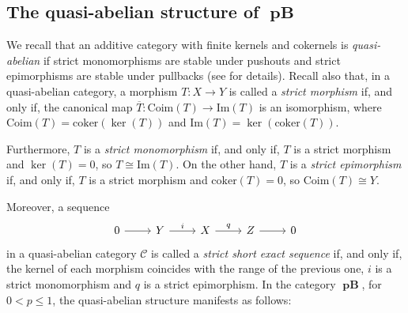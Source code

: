 \documentclass[12pt,a4paper]{amsproc}
\theoremstyle{remark}
\theoremstyle{definition}
\newcommand{\pBan}{\operatorname{\textbf{pB}}}
\numberwithin{equation}{section}
\begin{document}
\subsection{The quasi-abelian structure of \texorpdfstring{$\boldsymbol{\pBan}$}{pBan}} \label{subsec:quasi-abelian} \label{sec:pre_2.2}

We recall that an additive category with finite kernels and cokernels is \emph{quasi-abelian} if strict monomorphisms are stable under pushouts and strict epimorphisms are stable under pullbacks (see \cite{buehler2010, schneiders1999} for details). Recall also that, in a quasi-abelian category, a morphism $T: X \to Y$ is called a \emph{strict morphism} if, and only if, the canonical map $\overline{T}: \mathrm{Coim}(T) \to \mathrm{Im}(T)$ is an isomorphism, where $\mathrm{Coim}(T) = \mathrm{coker}(\ker(T))$ and $\mathrm{Im}(T) = \ker(\mathrm{coker}(T))$. 

Furthermore, $T$ is a \emph{strict monomorphism} if, and only if, $T$ is a strict morphism and $\ker(T) = 0$, so $T \cong \mathrm{Im}(T)$. On the other hand, $T$ is a \emph{strict epimorphism} if, and only if, $T$ is a strict morphism and $\mathrm{coker}(T) = 0$, so $\mathrm{Coim}(T) \cong Y$.
\par Moreover, a sequence
\begin{equation}\notag
    \begin{tikzcd}
		0 \arrow[r] & Y \arrow[r, "i"] & X \arrow[r, "q"] & Z \arrow[r] & 0
	\end{tikzcd} 
    \end{equation}
    in a quasi-abelian category $\mathcal{C}$ is called a \emph{strict short exact sequence} if, and only if, the kernel of each morphism coincides with the range of the previous one, $i$ is a strict monomorphism and $q$ is a strict epimorphism. In the category $\boldsymbol{\pBan}$, for $0 < p \le 1$, the quasi-abelian structure manifests as follows:
\end{document}
